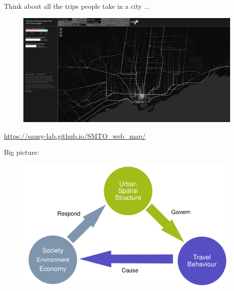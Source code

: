 \documentclass[aspectratio=169]{beamer}
\begin{document}
\begin{frame}
	
	Think about all the trips people take in a city ...
	
	\begin{figure}
		\centering
		\includegraphics[width=0.99\linewidth]{images/smto_stgeorge_all.png}
	\end{figure}
	\tiny\url{https://sausy-lab.github.io/SMTO_web_map/}
	
\end{frame}



\begin{frame}
	
	Big picture:
	
	\begin{figure}
	\centering
	\includegraphics[width=0.79\linewidth]{images/big_links.png}
	\end{figure}
	
\end{frame}
\end{document}
